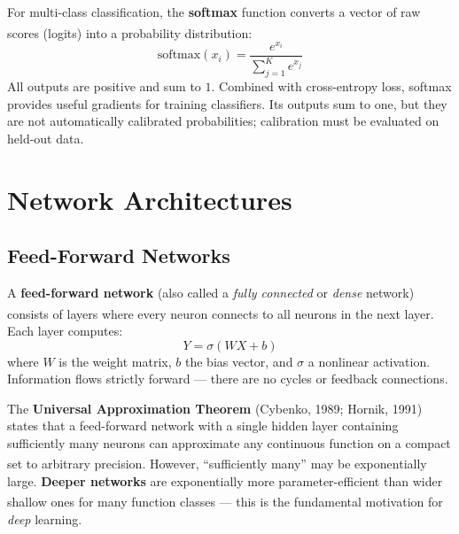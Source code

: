 \begin{tcbitemize}[ skin=sectionraster ]
    \tcbitem[title={Softmax for Classification}, raster multicolumn=3]
    For multi-class classification, the \textbf{softmax} function converts a vector of raw scores (logits) into a probability distribution\textsuperscript{\cite[][p.~18]{fleuretLittleBookDeep}}:
    \begin{equation}
        \mathrm{softmax}(x_i) = \frac{e^{x_i}}{\sum_{j=1}^{K} e^{x_j}}
    \end{equation}
    All outputs are positive and sum to $1$.
    Combined with cross-entropy loss, softmax provides useful gradients for training classifiers. Its outputs sum to one, but they are not automatically calibrated probabilities; calibration must be evaluated on held-out data.
\end{tcbitemize}


\section{Network Architectures}

\subsection{Feed-Forward Networks}

\begin{tcbitemize}[ skin=sectionraster ]
    \tcbitem[title={Dense Layers}, raster multicolumn=3]
    A \textbf{feed-forward network} (also called a \emph{fully connected} or \emph{dense} network) consists of layers where every neuron connects to all neurons in the next layer\textsuperscript{\cite[][pp.~15--17]{fleuretLittleBookDeep}}.
    Each layer computes:
    \begin{equation}
        Y = \sigma(WX + b)
    \end{equation}
    where $W$ is the weight matrix, $b$ the bias vector, and $\sigma$ a nonlinear activation.
    Information flows strictly forward --- there are no cycles or feedback connections.

    \tcbitem[title={Universal Approximation}, raster multicolumn=3]
    The \textbf{Universal Approximation Theorem} (Cybenko, 1989; Hornik, 1991) states that a feed-forward network with a single hidden layer containing sufficiently many neurons can approximate any continuous function on a compact set to arbitrary precision\textsuperscript{\cite[][p.~16]{fleuretLittleBookDeep}}.
    However, ``sufficiently many'' may be exponentially large.
    \textbf{Deeper networks} are exponentially more parameter-efficient than wider shallow ones for many function classes\textsuperscript{\cite[][pp.~8--12]{robertsPrinciplesDeepLearning2022}} --- this is the fundamental motivation for \emph{deep} learning.
\end{tcbitemize}

